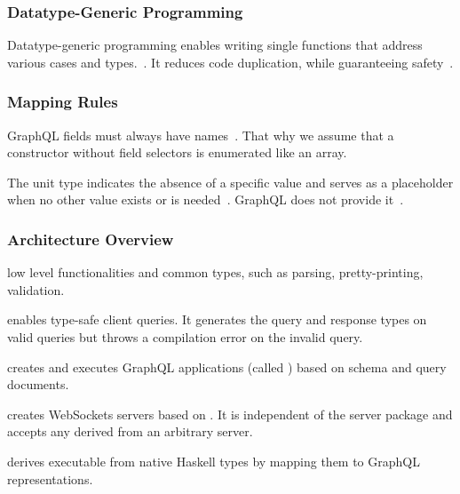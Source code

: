 \begin{frame}\frametitle{Datatype-Generic Programming}
    
  Datatype-generic programming enables writing single functions that address various cases and types.~\cite{derivable-type-classes}. 
  It reduces code duplication, while guaranteeing safety~\cite{datatype-generic-programming}.
  
  
  \end{frame}

\begin{frame}\frametitle{Mapping Rules}

\footnotesize
\begin{itemize}

   GraphQL fields must always have names~\cite{gql-spec}. 
  That why we assume that a constructor without field selectors is enumerated like an array.
  

   The unit type indicates the absence of a specific value and serves as a placeholder when no other value exists or is needed~\cite{fsharp-unit}. GraphQL does not provide it~\cite{gql-spec}. 


\end{itemize}
\end{frame}


\begin{frame}\frametitle{Architecture Overview}
  \begin{enumerate} 
  
    \footnotesize

     low level functionalities and common types, such as  parsing, pretty-printing, validation.
  
     enables type-safe client queries. It generates the query and response types on valid queries but throws a compilation error on the invalid query.
  
     creates and executes GraphQL applications (called ) based on schema and query documents.
    
      creates WebSockets servers based on . It is independent of the server package and accepts any  derived from an arbitrary server.
  
     derives executable  from native Haskell types by mapping them to GraphQL representations. 
  
  \end{enumerate}

\end{frame}


